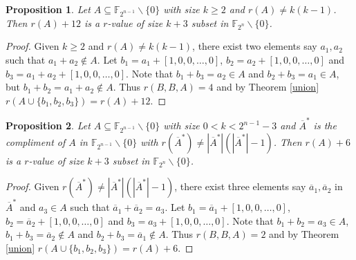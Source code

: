 \documentclass[12pt,a4paper]{article}
\newtheorem{prop}{Proposition}[section]
\begin{document}
	\begin{prop}\label{3-12}
		Let $A\subseteq\mathbb{F}_{2^{n-1}}\backslash\{0\}$ with size $k\geq2$ and $r(A)\neq k(k-1)$. Then $r(A)+12$ is a $r$-value of size $k+3$ subset in $\mathbb{F}_{2^{n}}\backslash\{0\}$.
	\end{prop}
	\begin{proof}
		
		Given $k\geq2$ and $r(A)\neq k(k-1)$, there exist two elements say $a_1, a_2$ such that $a_1+a_2\notin A$. Let $b_1=a_1+[1,0,0,\dots,0]$, $b_2=a_2+[1,0,0,\dots,0]$ and $b_3=a_1+a_2+[1,0,0,\dots,0]$. Note that $b_1+b_3=a_2\in A$ and $b_2+b_3=a_1\in A$, but $b_1+b_2=a_1+a_2\notin A$. Thus $r(B,B,A)=4$ and by Theorem \ref{union} $r(A\cup \{b_1,b_2,b_3\})=r(A)+12$.
	\end{proof}
	
	\begin{prop}\label{3-6}
		Let $A\subseteq\mathbb{F}_{2^{n-1}}\backslash\{0\}$ with size $0<k<2^{n-1}-3$ and $\overline{A}^*$ is the compliment of $A$ in $\mathbb{F}_{2^{n-1}}\backslash\{0\}$ with $r(\overline{A}^*)\neq|\overline{A}^*|(|\overline{A}^*|-1)$. Then $r(A)+6$ is a $r$-value of size $k+3$ subset in $\mathbb{F}_{2^{n}}\backslash\{0\}$.
	\end{prop}
	\begin{proof}
		
		Given $r(\overline{A}^*)\neq|\overline{A}^*|(|\overline{A}^*|-1)$, there exist three elements say $\overline{a}_1, \overline{a}_2$ in $\overline{A}^*$ and $a_3\in A$ such that $\overline{a}_1+\overline{a}_2=a_3$. Let $b_1=\overline{a}_1+[1,0,0,\dots,0]$, $b_2=\overline{a}_2+[1,0,0,\dots,0]$ and $b_3=a_3+[1,0,0,\dots,0]$. Note that $b_1+b_2=a_3\in A$, $b_1+b_3=\overline{a}_2\notin A$ and $b_2+b_3=\overline{a}_1\notin A$. Thus $r(B,B,A)=2$ and by Theorem \ref{union} $r(A\cup \{b_1,b_2,b_3\})=r(A)+6$.
	\end{proof}
	
\end{document}
